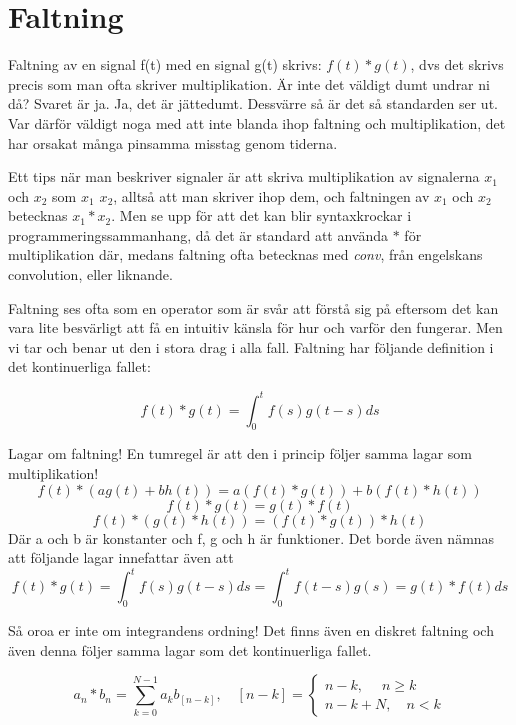 \documentclass{article}
\begin{document}
\section{Faltning}

Faltning av en signal f(t) med en signal g(t) skrivs: $f(t)*g(t)$, dvs det
skrivs precis som man ofta skriver multiplikation. Är inte det väldigt dumt
undrar ni då? Svaret är ja. Ja, det är jättedumt. Dessvärre så är det så
standarden ser ut. Var därför väldigt noga med att inte blanda ihop faltning
och multiplikation, det har orsakat många pinsamma misstag genom tiderna.
\newline

Ett tips när man beskriver signaler är att skriva multiplikation
av signalerna $x_1$ och $x_2$ som \emph{$x_1$ $x_2$}, alltså att man skriver ihop dem,
och faltningen av $x_1$ och $x_2$ betecknas $x_1 * x_2$. Men se upp för att det
kan blir syntaxkrockar i programmeringssammanhang, då det är standard att
använda $*$ för multiplikation där, medans faltning ofta betecknas med \emph{conv}, från engelskans convolution, eller liknande.


Faltning ses ofta som en operator som är svår att förstå sig på eftersom
det kan vara lite besvärligt att få en intuitiv känsla för hur och varför
den fungerar. Men vi tar och benar ut den i stora drag i alla fall.
Faltning har följande definition i det kontinuerliga fallet:

$$ f(t) * g(t) = \int_{0}^t  f(s) g(t-s) ds $$

Lagar om faltning! En tumregel är att den i princip följer samma lagar som multiplikation!
$$f(t) * (a g(t) + b h(t) ) = a(f(t) * g(t)) + b(f(t) * h(t))$$ %
$$f(t) * g(t) = g(t) * f(t) $$ %
$$f(t) * (g(t) * h(t)) = (f(t) * g(t)) * h(t) $$ %
Där a och b är konstanter och f, g och h är funktioner. Det borde även nämnas att följande lagar innefattar även att
$$ f(t) * g(t) = \int_{0}^t  f(s) g(t-s) ds = \int_{0}^t  f(t-s) g(s) = g(t) * f(t) ds $$

Så oroa er inte om integrandens ordning! Det finns även en diskret faltning och även denna följer samma lagar som det kontinuerliga fallet.


$$a_n * b_n = \sum_{k=0}^{N-1} a_k b_{[n-k]}, \quad [n-k] =
\begin{cases}
n-k, \quad  \; n \geq k \\
n-k+N, \quad  n < k
\end{cases}
$$
\end{document}
